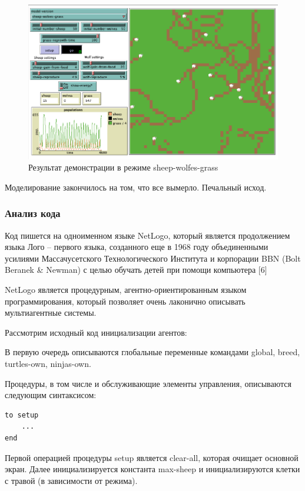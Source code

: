 \documentclass[14pt,a4paper,report]{report}
\begin{document}
\begin{figure}[h!]
	\centering
	\includegraphics[scale = 0.63]{images/7_2.png}
	\caption{Результат демонстрации в режиме sheep-wolfes-grass}
\end{figure}

Моделирование закончилось на том, что все вымерло. Печальный исход.

\subsubsection{Анализ кода}

Код пишется на одноименном языке NetLogo, который является продолжением языка Лого -- первого языка, созданного еще в 1968 году объединенными усилиями Массачусетского Технологического Института и корпорации BBN (Bolt Beranek \& Newman) с целью обучать детей при помощи компьютера [6]

NetLogo является процедурным, агентно-ориентированным языком программирования, который позволяет очень лаконично описывать мультиагентные системы.

Рассмотрим исходный код инициализации агентов:



В первую очередь описываются глобальные переменные командами global, breed, turtles-own, ninjas-own. 

Процедуры, в том числе и обслуживающие элементы управления, описываются следующим синтаксисом:

\begin{verbatim}
to setup
    ...
end
\end{verbatim}

Первой операцией процедуры setup является clear-all, которая очищает основной экран. Далее инициализируется константа max-sheep и инициализируются клетки с травой (в зависимости от режима).
\end{document}
